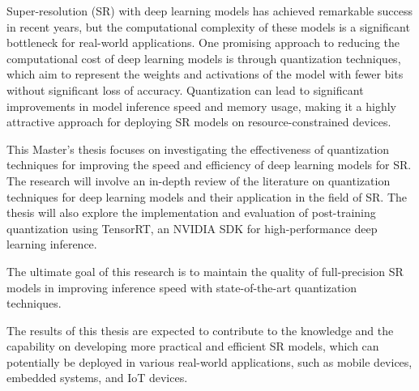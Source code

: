 \label{chap:Introduction}

Super-resolution (SR) with deep learning models has achieved remarkable success in recent years, but the computational complexity of these models is a significant bottleneck for real-world applications. One promising approach to reducing the computational cost of deep learning models is through quantization techniques, which aim to represent the weights and activations of the model with fewer bits without significant loss of accuracy. Quantization can lead to significant improvements in model inference speed and memory usage, making it a highly attractive approach for deploying SR models on resource-constrained devices.

This Master's thesis focuses on investigating the effectiveness of quantization techniques for improving the speed and efficiency of deep learning models for SR. The research will involve an in-depth review of the literature on quantization techniques for deep learning models and their application in the field of SR. The thesis will also explore the implementation and evaluation of post-training quantization using TensorRT, an NVIDIA SDK for high-performance deep learning inference. 

The ultimate goal of this research is to maintain the quality of full-precision SR models in improving inference speed with state-of-the-art quantization techniques.

The results of this thesis are expected to contribute to the knowledge and the capability on developing more practical and efficient SR models, which can potentially be deployed in various real-world applications, such as mobile devices, embedded systems, and IoT devices.

